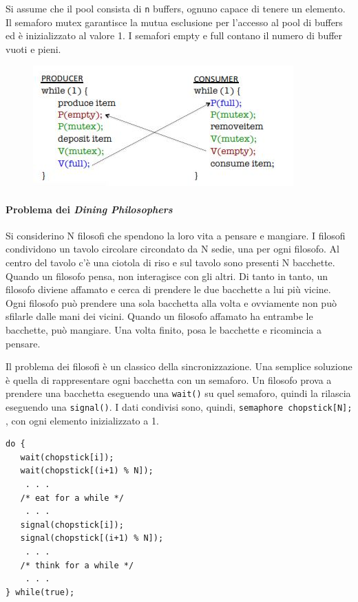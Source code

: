 \documentclass[a4paper]{article}
\begin{document}
Si assume che il pool consista di \texttt n buffers, ognuno capace di tenere un elemento. Il semaforo mutex garantisce la mutua esclusione per l'accesso al pool di buffers ed è inizializzato al valore 1. I semafori empty e full contano il numero di buffer vuoti e pieni.
\begin{figure}[htb]
   \includegraphics{img/sem_prod_cons.JPG}
\end{figure}

\paragraph{Problema dei \textit{Dining Philosophers}}
Si considerino N filosofi che spendono la loro vita a pensare e mangiare. I filosofi condividono un tavolo circolare circondato da N sedie, una per ogni filosofo. Al centro del tavolo c'è una ciotola di riso e sul tavolo sono presenti N bacchette. Quando un filosofo pensa, non interagisce con gli altri. Di tanto in tanto, un filosofo diviene affamato e cerca di prendere le due bacchette a lui più vicine. Ogni filosofo può prendere una sola bacchetta alla volta e ovviamente non può sfilarle dalle mani dei vicini. Quando un filosofo affamato ha entrambe le bacchette, può mangiare. Una volta finito, posa le bacchette e ricomincia a pensare.

Il problema dei filosofi è un classico della sincronizzazione. Una semplice soluzione è quella di rappresentare ogni bacchetta con un semaforo. Un filosofo prova a prendere una bacchetta eseguendo una \texttt{wait()} su quel semaforo, quindi la rilascia eseguendo una \texttt{signal()}. I dati condivisi sono, quindi, \texttt{semaphore chopstick[N];} , con ogni elemento inizializzato a 1.
\begin{verbatim}
do {
   wait(chopstick[i]);
   wait(chopstick[(i+1) % N]);
    . . .
   /* eat for a while */
    . . .
   signal(chopstick[i]);
   signal(chopstick[(i+1) % N]);
    . . .
   /* think for a while */
    . . .
} while(true);
\end{verbatim}
\end{document}
